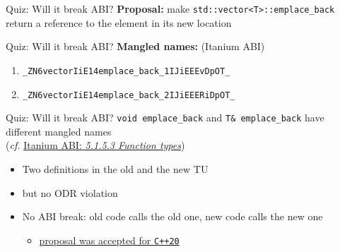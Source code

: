 \begin{frame}{Quiz: Will it break ABI?}
    \textbf{Proposal:} make \texttt{std::vector<T>::emplace\_back} return a reference to the element in its new location

    \vspace*{5mm}

    \centering


    \scalebox{2}{$\downarrow$}

\end{frame}

\begin{frame}[fragile]{Quiz: Will it break ABI?}
    \textbf{Mangled names:} (Itanium ABI)
    \begin{enumerate}
        \item \texttt{\_ZN6vectorIiE14emplace\_back\_1\textcolor{vertexDarkRed}{IJiEEEvDpOT\_}}
        \item \texttt{\_ZN6vectorIiE14emplace\_back\_2\textcolor{vertexDarkRed}{IJiEEERiDpOT\_}}
    \end{enumerate}
\end{frame}

\begin{frame}[fragile]{Quiz: Will it break ABI?}
    \texttt{void emplace\_back} and \texttt{T\& emplace\_back} have different mangled names\\
    (\textit{cf.} \href{https://itanium-cxx-abi.github.io/cxx-abi/abi.html#mangle.function-type}{Itanium ABI: \textit{5.1.5.3 Function types}})
    \begin{itemize}
        \item Two definitions in the old and the new TU
        \item but no ODR violation
        \item \textcolor{vertexDarkRed}{No ABI break:} old code calls the old one, new code calls the new one
        \begin{itemize}
            \item \href{https://en.cppreference.com/w/cpp/container/vector/emplace_back}{proposal was accepted for \texttt{C++20}}
        \end{itemize}
    \end{itemize}
\end{frame}

